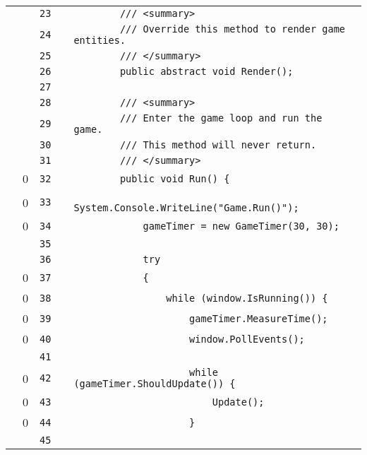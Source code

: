 \documentclass[a4paper,landscape,10pt]{article}
\begin{document}
\begin{longtable}[l]{lrrll}
\cellcolor{gray} &  & \verb~23~ & & \verb~        /// <summary>~\\
\cellcolor{gray} &  & \verb~24~ & & \verb~        /// Override this method to render game entities.~\\
\cellcolor{gray} &  & \verb~25~ & & \verb~        /// </summary>~\\
\cellcolor{gray} &  & \verb~26~ & & \verb~        public abstract void Render();~\\
\cellcolor{gray} &  & \verb~27~ & & \verb~~\\
\cellcolor{gray} &  & \verb~28~ & & \verb~        /// <summary>~\\
\cellcolor{gray} &  & \verb~29~ & & \verb~        /// Enter the game loop and run the game.~\\
\cellcolor{gray} &  & \verb~30~ & & \verb~        /// This method will never return.~\\
\cellcolor{gray} &  & \verb~31~ & & \verb~        /// </summary>~\\
\cellcolor{red} & 0 & \verb~32~ & & \verb~        public void Run() {~\\
\cellcolor{red} & 0 & \verb~33~ & & \verb~            System.Console.WriteLine("Game.Run()");~\\
\cellcolor{red} & 0 & \verb~34~ & & \verb~            gameTimer = new GameTimer(30, 30);~\\
\cellcolor{gray} &  & \verb~35~ & & \verb~~\\
\cellcolor{gray} &  & \verb~36~ & & \verb~            try~\\
\cellcolor{red} & 0 & \verb~37~ & & \verb~            {~\\
\cellcolor{red} & 0 & \verb~38~ & & \verb~                while (window.IsRunning()) {~\\
\cellcolor{red} & 0 & \verb~39~ & & \verb~                    gameTimer.MeasureTime();~\\
\cellcolor{red} & 0 & \verb~40~ & & \verb~                    window.PollEvents();~\\
\cellcolor{gray} &  & \verb~41~ & & \verb~~\\
\cellcolor{red} & 0 & \verb~42~ & & \verb~                    while (gameTimer.ShouldUpdate()) {~\\
\cellcolor{red} & 0 & \verb~43~ & & \verb~                        Update();~\\
\cellcolor{red} & 0 & \verb~44~ & & \verb~                    }~\\
\cellcolor{gray} &  & \verb~45~ & & \verb~~\\

\end{longtable}
\end{document}
